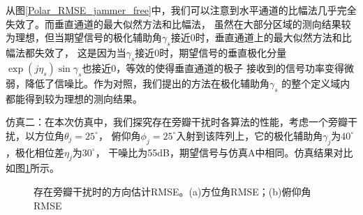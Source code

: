 \documentclass[master]{thesis-uestc}
\begin{document}
从图\ref{Polar_RMSE_jammer_free}中，我们可以注意到水平通道的比幅法几乎完全失效了。而垂直通道的最大似然方法和比幅法，
虽然在大部分区域的测向结果较为理想，但当期望信号的极化辅助角$\gamma_s$接近0时，垂直通道上的最大似然方法和比幅法都失效了，
这是因为当$\gamma_s$接近0时，期望信号的垂直极化分量$\exp(j\eta_s)\sin\gamma_s$也接近0，等效的使得垂直通道的极子
接收到的信号功率变得微弱，降低了信噪比。作为对照，我们提出的方法在极化辅助角$\gamma_s$
的整个定义域内都能得到较为理想的测向结果。

仿真二：在本次仿真中，我们探究存在旁瓣干扰时各算法的性能，考虑一个旁瓣干扰，以方位角$\theta_j=25^\circ$，
俯仰角$\phi_j=25^\circ$入射到该阵列上，它的极化辅助角$\gamma_j$为$40^\circ$，极化相位差$\eta_j$为$30^\circ$，
干噪比为55dB，期望信号与仿真A中相同。仿真结果对比如图\ref{Polar_RMSE_SLJ}所示。
\begin{figure}[H]
    \caption{存在旁瓣干扰时的方向估计RMSE。(a)方位角RMSE；(b)俯仰角RMSE}
    \label{Polar_RMSE_SLJ}
\end{figure}
\end{document}
